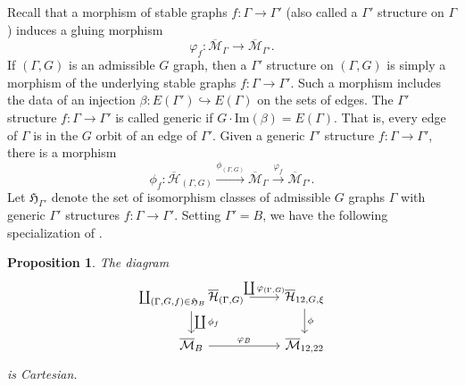 \documentclass[12pt]{amsart}
\newtheorem{prop}[thm]{Proposition}
\theoremstyle{definition}
\newcommand{\Hb}{\overline{\mathcal{H}}}
\newcommand{\M}{\mathcal{M}}
\newcommand{\Mb}{\overline{\M}}
\begin{document}
Recall that a morphism of stable graphs $f:\Gamma\rightarrow \Gamma'$ (also called a $\Gamma'$ structure on $\Gamma$) induces a gluing morphism
\[
\varphi_{f}:\Mb_{\Gamma}\rightarrow \Mb_{\Gamma'}.
\]
If $(\Gamma,G)$ is an admissible $G$ graph, then a $\Gamma'$ structure on $(\Gamma,G)$ is simply a morphism of the underlying stable graphs $f:\Gamma\rightarrow \Gamma'$. Such a morphism includes the data of an injection $\beta:E(\Gamma')\hookrightarrow E(\Gamma)$ on the sets of edges. The $\Gamma'$ structure $f:\Gamma\rightarrow \Gamma'$ is called generic if $G\cdot \mathrm{Im}(\beta)=E(\Gamma)$. That is, every edge of $\Gamma$ is in the $G$ orbit of an edge of $\Gamma'$. Given a generic $\Gamma'$ structure $f:\Gamma\rightarrow \Gamma'$, there is a morphism
\[
\phi_{f}:\Hb_{(\Gamma,G)}\xrightarrow{\phi_{(\Gamma,G)}} \Mb_{\Gamma}\xrightarrow{\varphi_f} \Mb_{\Gamma'}.
\]
Let $\mathfrak{H}_{\Gamma'}$ denote the set of isomorphism classes of admissible $G$ graphs $\Gamma$ with generic $\Gamma'$ structures $f:\Gamma\rightarrow \Gamma'$. Setting $\Gamma'=B$, we have the following specialization of \cite[Proposition 4.3]{SvZ}.
\begin{prop}
The diagram
    \begin{equation}\label{cartesian}
        \begin{tikzcd}
{ \coprod_{(\Gamma,G,f)\in \mathfrak{H}_B} \Hb_{(\Gamma,G)}} \arrow[d, "\coprod\phi_f"] \arrow[r, "{\coprod\varphi_{(\Gamma,G)}}"] & {\Hb_{12,G,\xi}} \arrow[d, "\phi"] \\
\Mb_{B} \arrow[r, "\varphi_B"]                                                                             & {\Mb_{12,22}}                         
\end{tikzcd}
    \end{equation}
is Cartesian.
\end{prop}
\end{document}
